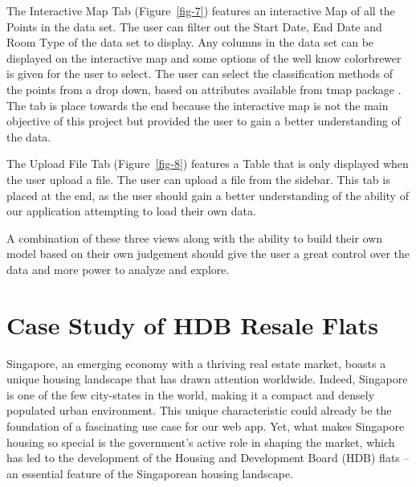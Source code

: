\documentclass[manuscript,screen]{acmart}
\begin{document}
The Interactive Map Tab (Figure~\ref{fig-7}) features an interactive Map
of all the Points in the data set. The user can filter out the Start
Date, End Date and Room Type of the data set to display. Any columns in
the data set can be displayed on the interactive map and some options of
the well know colorbrewer \citep{colorbrewer} is given for the user to
select. The user can select the classification methods of the points
from a drop down, based on attributes available from tmap package
\citep{tmap}. The tab is place towards the end because the interactive
map is not the main objective of this project but provided the user to
gain a better understanding of the data.

The Upload File Tab (Figure~\ref{fig-8}) features a Table that is only
displayed when the user upload a file. The user can upload a file from
the sidebar. This tab is placed at the end, as the user should gain a
better understanding of the ability of our application attempting to
load their own data.

A combination of these three views along with the ability to build their
own model based on their own judgement should give the user a great
control over the data and more power to analyze and explore.

\hypertarget{case-study-of-hdb-resale-flats}{%
\section{\texorpdfstring{\textbf{Case Study of HDB Resale
Flats}}{Case Study of HDB Resale Flats}}\label{case-study-of-hdb-resale-flats}}

Singapore, an emerging economy with a thriving real estate market,
boasts a unique housing landscape that has drawn attention worldwide.
Indeed, Singapore is one of the few city-states in the world, making it
a compact and densely populated urban environment. This unique
characteristic could already be the foundation of a fascinating use case
for our web app. Yet, what makes Singapore housing so special is the
government's active role in shaping the market, which has led to the
development of the Housing and Development Board (HDB) flats -- an
essential feature of the Singaporean housing landscape.~
\end{document}
